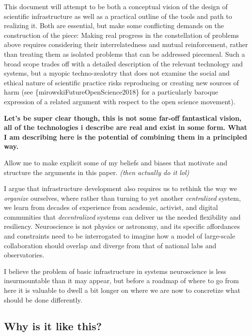 \documentclass[nohyper]{tufte-book-jls}
\begin{document}
This document will attempt to be both a conceptual vision of the design
of scientific infrastructure as well as a practical outline of the tools
and path to realizing it. Both are essential, but make some conflicting
demands on the construction of the piece: Making real progress in the
constellation of problems above requires considering their
interrelatedness and mutual reinforcement, rather than treating them as
isolated problems that can be addressed piecemeal. Such a broad scope
trades off with a detailed description of the relevant technology and
systems, but a myopic techno-zealotry that does not examine the social
and ethical nature of scientific practice risks reproducing or creating
new sources of harm (see \{mirowskiFutureOpenScience2018\} for a
particularly baroque expression of a related argument with respect to
the open science movement).

\textbf{Let's be super clear though, this is not some far-off
fantastical vision, all of the technologies i describe are real and
exist in some form. What I am describing here is the potential of
combining them in a principled way.}

Allow me to make explicit some of my beliefs and biases that motivate
and structure the arguments in this paper. \emph{(then actually do it
lol)}

I argue that infrastructure development also requires us to rethink the
way we \emph{organize} ourselves, where rather than turning to yet
another \emph{centralized} system, we learn from decades of experience
from academic, activist, and digital communities that
\emph{decentralized} systems can deliver us the needed flexibility and
resiliency. Neuroscience is not physics or astronomy, and its specific
affordances and constraints need to be interrogated to imagine how a
model of large-scale collaboration should overlap and diverge from that
of national labs and observatories.

I believe the problem of basic infrastructure in systems neuroscience is
less insurmountable than it may appear, but before a roadmap of where to
go from here it is valuable to dwell a bit longer on where we are now to
concretize what should be done differently.

\hypertarget{why-is-it-like-this}{%
\subsection{Why is it like this?}\label{why-is-it-like-this}}
\end{document}
